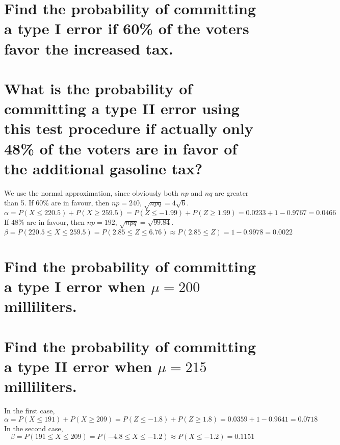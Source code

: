 \documentclass[answers]{exam}
\begin{document}
\begin{questions}
\begin{parts}
    \part{Find the probability of committing a type I error if 60\% of the voters favor the increased tax.}
    \part{What is the probability of committing a type II error using this test procedure if actually only 48\% of the voters are in favor of the additional gasoline tax?}
\end{parts}

\begin{solution}
    We use the normal approximation, since obviously both $np$ and $nq$ are greater than 5. If $60\%$ are in favour, then $np = 240$, $\sqrt{npq} = 4\sqrt{6}$.
    $$\alpha = P(X \leq 220.5) + P(X \geq 259.5) = P(Z \leq -1.99) + P(Z \geq 1.99) = 0.0233 + 1 - 0.9767 = 0.0466$$
    If $48\%$ are in favour, then $np = 192$, $\sqrt{npq} = \sqrt{99.84}$.
    $$\beta = P(220.5 \leq X \leq 259.5) = P(2.85 \leq Z \leq 6.76) \approx P(2.85 \leq Z) = 1 - 0.9978 = 0.0022$$
\end{solution}


\begin{parts}
    \part{Find the probability of committing a type I error when $\mu = 200$ milliliters.}
    \part{Find the probability of committing a type II error when $\mu = 215$ milliliters.}
\end{parts}

\begin{solution}
    In the first case,
    $$\alpha = P(X \leq 191) + P(X \geq 209) = P(Z \leq -1.8) + P(Z \geq 1.8) = 0.0359 + 1 - 0.9641 = 0.0718$$
    In the second case,
    $$\beta = P(191 \leq X \leq 209) = P(-4.8 \leq X \leq -1.2) \approx P(X \leq -1.2) = 0.1151$$
\end{solution}


\end{questions}
\end{document}

